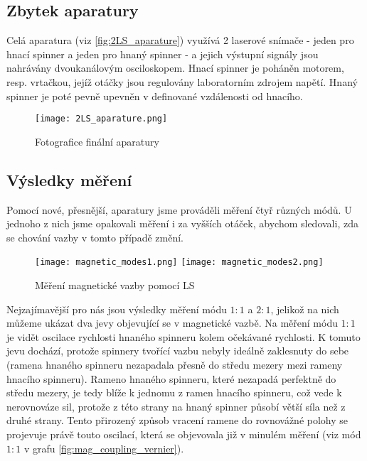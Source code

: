 \subsection{Zbytek aparatury}
\label{sub:main_2LS_aparature}

Celá aparatura (viz \autoref{fig:2LS_aparature}) využívá 2 laserové snímače - jeden pro hnací spinner a jeden pro hnaný spinner - a jejich výstupní signály jsou nahrávány dvoukanálovým osciloskopem. Hnací spinner je poháněn motorem, resp. vrtačkou, jejíž otáčky jsou regulovány laboratorním zdrojem napětí. Hnaný spinner je poté pevně upevněn v definované vzdálenosti od hnacího.

\clearpage
\begin{figure}[H]
    \texttt{[image: 2LS\_aparature.png]}
    \centering
    \caption{Fotografice finální aparatury}
    \label{fig:2LS_aparature}
\end{figure}
\subsection{Výsledky měření}
{
    \raggedright
    Pomocí nové, přesnější, aparatury jsme prováděli měření čtyř různých módů. U jednoho z nich jsme opakovali měření i za vyšších otáček, abychom sledovali, zda se chování vazby v tomto případě změní.
}
\begin{figure}[H]
    \texttt{[image: magnetic\_modes1.png]}
    \texttt{[image: magnetic\_modes2.png]}
    \centering
    \caption{Měření magnetické vazby pomocí LS}
    \label{fig:ang_sub_periods}
\end{figure}

Nejzajímavější pro nás jsou výsledky měření módu $1:1$ a $2:1$, jelikož na nich můžeme ukázat dva jevy objevující se v magnetické vazbě. Na měření módu $1:1$ je vidět oscilace rychlosti hnaného spinneru kolem očekávané rychlosti. K tomuto jevu dochází, protože spinnery tvořící vazbu nebyly ideálně zaklesnuty do sebe (ramena hnaného spinneru nezapadala přesně do středu mezery mezi rameny hnacího spinneru). Rameno hnaného spinneru, které nezapadá perfektně do středu mezery, je tedy blíže k jednomu z ramen hnacího spinneru, což vede k nerovnováze sil, protože z této strany na hnaný spinner působí větší síla než z druhé strany. Tento přirozený způsob vracení ramene do rovnovážné polohy se projevuje právě touto oscilací, která se objevovala již v minulém měření (viz mód $1:1$ v grafu \ref{fig:mag_coupling_vernier}).

